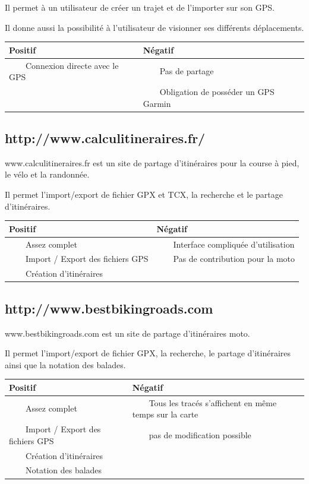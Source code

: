 \documentclass[a4paper]{article}
\newcommand{\tabitem}{~~\llap{\textbullet}~~}
\begin{document}
Il permet à un utilisateur de créer un trajet et de l'importer sur son GPS.

Il donne aussi la possibilité à l'utilisateur de visionner ses différents déplacements.

\begin{tabular}{|l|l|}
	\hline
	Positif                                & Négatif                                       \\ \hline\hline
	\tabitem Connexion directe avec le GPS & \tabitem Pas de partage                       \\
	                                       & \tabitem Obligation de posséder un GPS Garmin \\ \hline
\end{tabular}
 
\subsection{http://www.calculitineraires.fr/}

www.calculitineraires.fr est un site de partage d'itinéraires pour la course à pied, le vélo et la randonnée.

Il permet l'import/export de fichier GPX et TCX, la recherche et le partage d'itinéraires.

\begin{tabular}{|l|l|}
	\hline
	Positif                                   & Négatif                                     \\ \hline\hline
	\tabitem Assez complet                    & \tabitem Interface compliquée d'utilisation \\
	\tabitem Import / Export des fichiers GPS & \tabitem Pas de contribution pour la moto   \\
	\tabitem Création d'itinéraires            &                                             \\ \hline
\end{tabular}


\subsection{http://www.bestbikingroads.com}
www.bestbikingroads.com est un site de partage d'itinéraires moto.


Il permet l'import/export de fichier GPX, la recherche, le partage d'itinéraires ainsi que la notation des balades.

\begin{tabular}{|l|l|}
	\hline
	Positif                                   & Négatif                                                         \\ \hline\hline
	\tabitem Assez complet                    & \tabitem Tous les tracés s'affichent en même temps sur la carte \\
	\tabitem Import / Export des fichiers GPS & \tabitem pas de modification possible                           \\
	\tabitem Création d'itinéraires           &  \\
	\tabitem Notation des balades             &  \\ \hline
\end{tabular}
\end{document}
